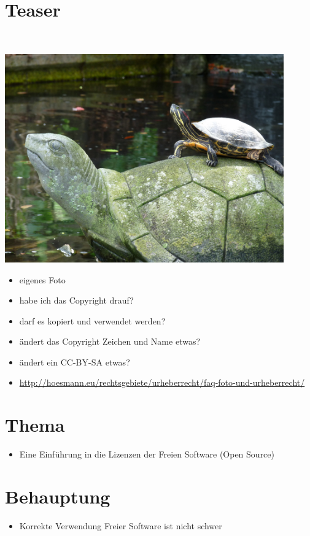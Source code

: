 \section{Teaser}
\begin{frame}
	\\
	\visible<4->{ CC-BY-SA}
	\begin{center}
		\includegraphics[width=0.9\textwidth]{res/turtles.jpg}
	\end{center}
\end{frame}
\note
{
	\begin{itemize}
		\item eigenes Foto
		\item habe ich das Copyright drauf?
		\item darf es kopiert und verwendet werden?
		\item ändert das Copyright Zeichen und Name etwas?
		\item ändert ein CC-BY-SA etwas?
		\item \url{http://hoesmann.eu/rechtsgebiete/urheberrecht/faq-foto-und-urheberrecht/}
	\end{itemize}
}

\section{Thema}
\note
{
	\begin{itemize}
		\item Eine Einführung in die Lizenzen der Freien Software (Open Source)
	\end{itemize}
}

\section{Behauptung}
\note
{
	\begin{itemize}
		\item Korrekte Verwendung Freier Software ist nicht schwer
	\end{itemize}
}

